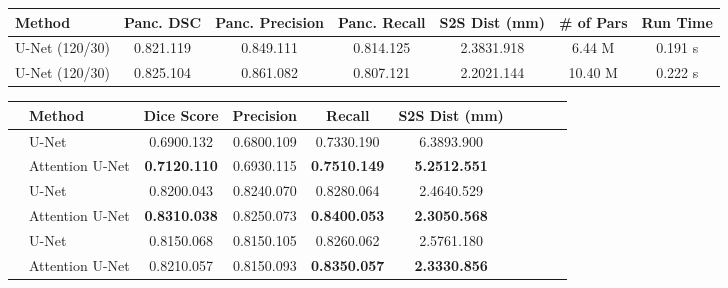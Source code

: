 \documentclass{article}
\begin{document}
\begin{table}[t]\footnotesize
	\parbox{\textwidth}{
		\centering
		\label{tab:results_attention_3}
		\vspace{1 mm}
		\begin{tabular}{@{\extracolsep{1pt}}lcccccc@{}} 
			Method  & Panc. DSC & Panc. Precision & Panc. Recall & S2S Dist (mm) &\# of Pars & Run Time   \\ \midrule
			U-Net (120/30) & 0.821.119 & 0.849.111 & 0.814.125 & 2.3831.918 & 6.44 M & 0.191 s\\
			U-Net (120/30) & 0.825.104 & 0.861.082 & 0.807.121 & 2.2021.144 & 10.40 M &  0.222 s\\
			\midrule
		\end{tabular}
		\label{tab:results_attention_4}
		\vspace{1 mm}
		\begin{tabular}{@{\extracolsep{1pt}}llcccccccc@{}} 
			& Method  & Dice Score & Precision & Recall & S2S Dist (mm)  \\ \midrule
			\parbox[t]{2mm}{}
			& U-Net \cite{ronneberger2015u} & 0.6900.132 & 0.6800.109 & 0.7330.190 & 6.3893.900\\
			& Attention U-Net & \textbf{0.7120.110} & 0.6930.115 & \textbf{0.7510.149} & \textbf{5.2512.551}\\
			\midrule
			\parbox[t]{2mm}{}
			& U-Net \cite{ronneberger2015u} & 0.8200.043 & 0.8240.070 & 0.8280.064 & 2.4640.529\\
			& Attention U-Net & \textbf{0.8310.038} & 0.8250.073 & \textbf{0.8400.053} &  \textbf{2.3050.568}\\ 
			\midrule
			\parbox[t]{2mm}{}
			& U-Net \cite{ronneberger2015u} & 0.8150.068 & 0.8150.105 & 0.8260.062 & 2.5761.180 \\
			& Attention U-Net & 0.8210.057 & 0.8150.093 & \textbf{0.8350.057} & \textbf{2.3330.856} \\
			\midrule
		\end{tabular}
	}
\end{table}
\end{document}
